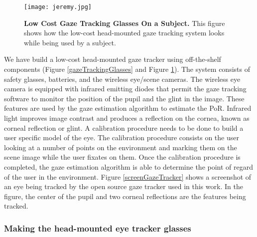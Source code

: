 \documentclass[jou,a4paper,notxfonts]{apa}
\begin{document}
\begin{figure}[tp]
 \texttt{[image: jeremy.jpg]}
 \caption{\textbf{Low Cost Gaze Tracking Glasses On a Subject.} This figure shows how the low-cost head-mounted gaze
 tracking system looks while being used by a subject.}
 \label{jeremy}
\end{figure}

We have build a low-cost head-mounted gaze tracker using off-the-shelf components (Figure \ref{gazeTrackingGlasses} and Figure \ref{jeremy}). The system consists of
safety glasses, batteries, and the wireless eye/scene cameras. The wireless eye camera
is equipped with infrared emitting diodes that permit the gaze tracking software to monitor the position of the pupil and the glint in the image. These features are used by the gaze estimation algorithm to estimate the PoR. Infrared light improves image contrast and produces a reflection on
the cornea, known as corneal reflection or glint. A calibration procedure needs to be done to build a user specific model of the eye. The calibration procedure consists on the user looking at a number of points on the environment and marking them on the scene image while the user fixates on them. Once the calibration procedure is completed, the gaze estimation algorithm is able to determine the point of regard of the user in the environment. Figure \ref{screenGazeTracker} shows a screenshot of an eye being tracked by the open source gaze tracker  \cite{mardanbegi2012eye} used in this work. In the figure, the center of the pupil and two corneal reflections are the features being tracked.

\subsubsection{Making the head-mounted eye tracker glasses}\hspace{0pt} \\
\end{document}

